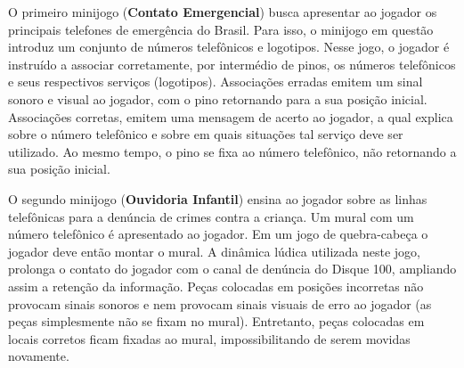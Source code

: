 O primeiro minijogo (\textbf{Contato Emergencial}) busca apresentar ao jogador os principais telefones de emergência do Brasil. Para isso, o minijogo em questão introduz um conjunto de números telefônicos e logotipos. Nesse jogo, o jogador é instruído a associar corretamente, por intermédio de pinos, os números telefônicos e seus respectivos serviços (logotipos). Associações erradas emitem um sinal sonoro e visual ao jogador, com o pino retornando para a sua posição inicial. Associações corretas, emitem uma mensagem de acerto ao jogador, a qual explica sobre o número telefônico e sobre em quais situações tal serviço deve ser utilizado. Ao mesmo tempo, o pino se fixa ao número telefônico, não retornando a sua posição inicial.


O segundo minijogo (\textbf{Ouvidoria Infantil}) ensina ao jogador sobre as linhas telefônicas para a denúncia de crimes contra a criança. Um mural com um número telefônico é apresentado ao jogador. %
Em um jogo de quebra-cabeça o jogador deve então montar o mural. A dinâmica lúdica utilizada neste jogo, prolonga o contato do jogador com o canal de denúncia do Disque 100, ampliando assim a retenção da informação. Peças colocadas em posições incorretas não provocam sinais sonoros e nem provocam sinais visuais de erro ao jogador (as peças simplesmente não se fixam no mural). Entretanto, peças colocadas em locais corretos ficam fixadas ao mural, impossibilitando de serem movidas novamente. 


